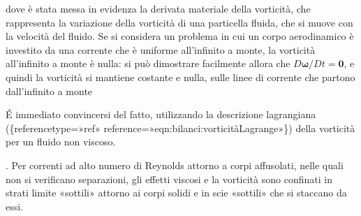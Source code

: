 \documentclass[letterpaper,10pt,italian]{jupyterBook}
\begin{document}
\sphinxAtStartPar
dove è stata messa in evidenza la derivata materiale della vorticità,
che rappresenta la variazione della vorticità di una particella fluida,
che si muove con la velocità del fluido. Se si considera un problema in
cui un corpo aerodinamico è investito da una corrente che è uniforme
all’infinito a monte, la vorticità all’infinito a monte è nulla: si può
dimostrare facilmente allora che \(D\mathbf{\omega} / D t = \mathbf{0}\), e quindi
la vorticità si mantiene costante e nulla, sulle linee di corrente che
partono dall’infinito a monte%
\begin{footnote}[1]\sphinxAtStartFootnote
É immediato convincersi del fatto, utilizzando la descrizione
lagrangiana
(\{reference\sphinxhyphen{}type=»ref»
reference=»eqn:bilanci:vorticitàLagrange»\}) della vorticità per un
fluido non viscoso.
%
\end{footnote}. Per correnti ad alto numero di
Reynolds attorno a corpi affusolati, nelle quali non si verificano
separazioni, gli effetti viscosi e la vorticità sono confinati in strati
limite «sottili» attorno ai corpi solidi e in scie «sottili» che si
staccano da essi.
\end{document}
